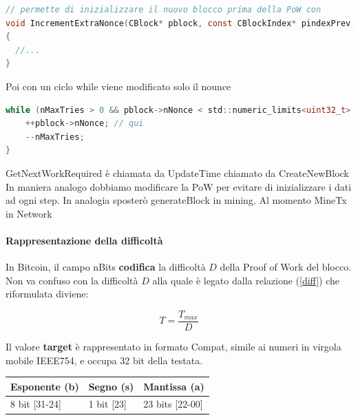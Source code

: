 \documentclass{book}
\theoremstyle{definition}
\begin{document}
\lstset{style=mystyle}
\begin{lstlisting}[language=c]
// permette di inizializzare il nuovo blocco prima della PoW con
void IncrementExtraNonce(CBlock* pblock, const CBlockIndex* pindexPrev, unsigned int& nExtraNonce)
{
  //...
}
\end{lstlisting}

Poi con un ciclo while viene modificato solo il nounce

\lstset{style=mystyle}
\begin{lstlisting}[language=c]
while (nMaxTries > 0 && pblock->nNonce < std::numeric_limits<uint32_t>::max() && !CheckProofOfWork(pblock->GetHash(), pblock->nBits, Params().GetConsensus()) && !ShutdownRequested()) {
    ++pblock->nNonce; // qui
    --nMaxTries;
}
\end{lstlisting}

GetNextWorkRequired è chiamata da UpdateTime chiamato da CreateNewBlock
In maniera analogo dobbiamo modificare la PoW per evitare di inizializzare i dati ad ogni step.
In analogia sposterò generateBlock in mining. Al momento MineTx in Network

\paragraph{Rappresentazione della difficoltà}


In Bitcoin, il campo nBits \textbf{codifica} la difficoltà $D$ della Proof of Work del blocco.
Non va confuso con la difficoltà $D$ alla quale è legato dalla relazione (\ref{diff}) che riformulata diviene:

\begin{equation}
    T = \frac{T_{max}}{D} \label{targetFromDiff}
\end{equation}

Il valore \textbf{target} è rappresentato in formato Compat, simile ai numeri in virgola mobile IEEE754, e occupa 32 bit della testata.

\begin{table}[ht]
    \centering
    \begin{tabular}{|l|l|l|}
        \hline
        \multicolumn{1}{|c|}{Esponente (b)} & \multicolumn{1}{c|}{Segno (s)} & \multicolumn{1}{c|}{Mantissa (a)} \\ \hline
        8 bit {[}31-24{]}               & 1 bit {[}23{]}             & 23 bits {[}22-00{]}           \\ \hline
    \end{tabular}
\end{table}
\end{document}
